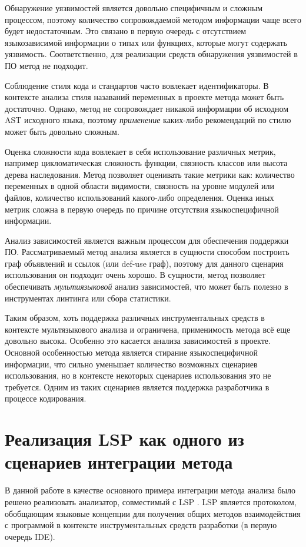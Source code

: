 Обнаружение уязвимостей является довольно специфичным и сложным процессом, поэтому
количество сопровождаемой методом информации чаще всего будет недостаточным. Это связано
в первую очередь с отсутствием языкозависимой информации о типах или функциях, которые
могут содержать уязвимость. Соответственно, для реализации средств обнаружения уязвимостей в ПО
метод не подходит.

Соблюдение стиля кода и стандартов часто вовлекает идентификаторы. В контексте
анализа стиля назаваний переменных в проекте метода может быть достаточно. Однако, метод
не сопровождает никакой информации об исходном AST исходного языка, поэтому \textit{применение}
каких-либо рекомендаций по стилю может быть довольно сложным.

Оценка сложности кода вовлекает в себя использование различных метрик, например цикломатическая сложность
функции, связность классов или высота дерева наследования. Метод позволяет оценивать такие метрики как:
количество переменных в одной области видимости, связность на уровне модулей или файлов, количество
использований какого-либо определения. Оценка иных метрик сложна в первую очередь по причине отсутствия
языкоспецифичной информации.

Анализ зависимостей является важным процессом для обеспечения поддержки ПО. Рассматриваемый
метод анализа является в сущности способом построить граф объявлений и ссылок (или def-use граф), поэтому
для данного сценария использования он подходит очень хорошо. В сущности, метод позволяет обеспечивать
\textit{мультиязыковой} анализ зависимостей, что может быть полезно в инструментах линтинга или
сбора статистики.

Таким образом, хоть поддержка различных инструментальных средств в контексте мультязыкового анализа и
ограничена, применимость метода всё еще довольно высока. Особенно это касается анализа зависимостей
в проекте. Основной особенностью метода является стирание языкоспецифичной информации, что
сильно уменьшает количество возможных сценариев использования, но в контексте некоторых сценариев использования
это не требуется. Одним из таких сценариев является поддержка разработчика в процессе кодирования.

\section{Реализация LSP как одного из сценариев интеграции метода}

В данной работе в качестве основного примера интеграции метода анализа было решено реализовать
анализатор, совместимый с LSP 
 \cite{LSP-spec}. LSP является протоколом, обобщающим языковые концепции для получения общих
методов взаимодействия с программой в контексте инструментальных средств разработки (в первую очередь IDE).

